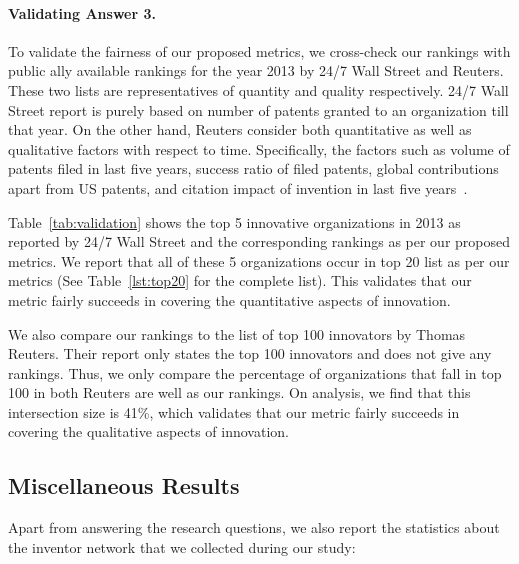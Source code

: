 \paragraph{Validating Answer 3.}
To validate the fairness of our proposed metrics, we cross-check our rankings
with public ally available rankings for the year 2013 by 24/7 Wall Street and
Reuters. These two lists are representatives of quantity and quality
respectively.  24/7 Wall Street report is purely based on number of patents
granted to an organization till that year.  On the other hand, Reuters
consider both quantitative as well as qualitative factors with respect to
time. Specifically, the factors such as volume of patents filed in last five
years, success ratio of filed patents, global contributions apart from US
patents, and citation impact of invention in last five years~\cite{reuters-method}.

Table~\ref{tab:validation} shows the top 5 innovative organizations in 2013 as
reported by 24/7 Wall Street and the corresponding rankings as per our
proposed metrics. We report that all of these 5 organizations occur in top 20
list as per our metrics (See Table~\ref{lst:top20} for the complete list).
This validates that our metric fairly succeeds in covering the quantitative
aspects of innovation.

We also compare our rankings to the list of top 100 innovators by Thomas
Reuters. Their report only states the top 100 innovators and does not give any
rankings. Thus, we only compare the percentage of organizations that fall in
top 100 in both Reuters are well as our rankings. On analysis, we find that
this intersection size is 41\%, which validates that our metric fairly
succeeds in covering the qualitative aspects of innovation.


\subsection{Miscellaneous Results}

Apart from answering the research questions, we also report the statistics about the inventor network that we collected during our study:

